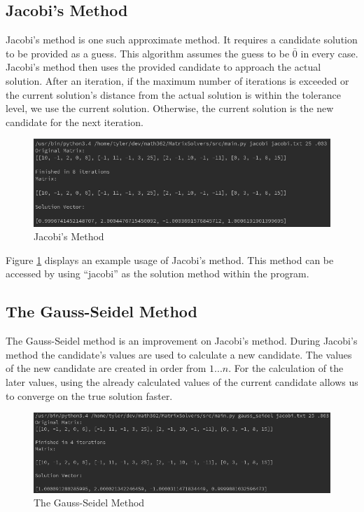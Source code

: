 \documentclass[12pt]{article}
\begin{document}
\subsection{Jacobi's Method}
Jacobi's method is one such approximate method. It requires a candidate solution
to be provided as a guess. This algorithm assumes the guess to be $\bar{0}$ in 
every case. Jacobi's method then uses the provided candidate to approach the 
actual solution. After an iteration, if the maximum number of iterations is exceeded
or the current solution's distance from the actual solution is within the tolerance 
level, we use the current solution. Otherwise, the current solution is the new 
candidate for the next iteration. 
\begin{figure}[H]
\begin{center}
\includegraphics[scale=.5]{jacobi.png}
\caption{Jacobi's Method}
\label{jacobi}
\end{center}
\end{figure}

Figure \ref{jacobi} displays an example usage of Jacobi's method. This method can be accessed by using ``jacobi''
as the solution method within the program.


\subsection{The Gauss-Seidel Method}
The Gauss-Seidel method is an improvement on Jacobi's method. During Jacobi's method
the candidate's values are used to calculate a new candidate. The values of the
new candidate are created in order from $1...n$. For the calculation of the later
values, using the already calculated values of the current candidate allows us 
to converge on the true solution faster.

 
\begin{figure}[H]
\begin{center}
\includegraphics[scale=.5]{gauss_seidel.png}
\caption{The Gauss-Seidel Method}
\label{gauss_seidel}
\end{center}
\end{figure}
\end{document}
